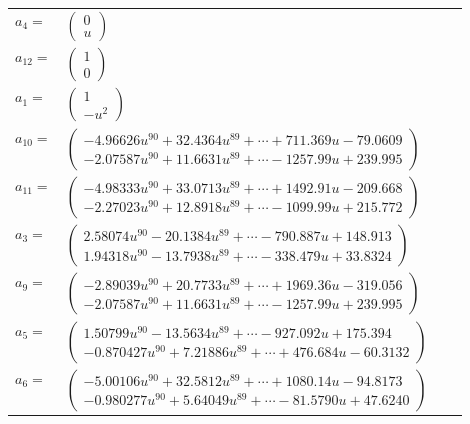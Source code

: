 \documentclass[1p]{elsarticle_modified}
\theoremstyle{definition}
\begin{document}
\begin{tabular}{m{7pt} m{180pt} m{7pt} m{180pt} }
\flushright $a_{4}=$&$\begin{pmatrix}0\\u\end{pmatrix}$ \\
\flushright $a_{12}=$&$\begin{pmatrix}1\\0\end{pmatrix}$ \\
\flushright $a_{1}=$&$\begin{pmatrix}1\\- u^2\end{pmatrix}$ \\
\flushright $a_{10}=$&$\begin{pmatrix}-4.96626 u^{90}+32.4364 u^{89}+\cdots+711.369 u-79.0609\\-2.07587 u^{90}+11.6631 u^{89}+\cdots-1257.99 u+239.995\end{pmatrix}$ \\
\flushright $a_{11}=$&$\begin{pmatrix}-4.98333 u^{90}+33.0713 u^{89}+\cdots+1492.91 u-209.668\\-2.27023 u^{90}+12.8918 u^{89}+\cdots-1099.99 u+215.772\end{pmatrix}$ \\
\flushright $a_{3}=$&$\begin{pmatrix}2.58074 u^{90}-20.1384 u^{89}+\cdots-790.887 u+148.913\\1.94318 u^{90}-13.7938 u^{89}+\cdots-338.479 u+33.8324\end{pmatrix}$ \\
\flushright $a_{9}=$&$\begin{pmatrix}-2.89039 u^{90}+20.7733 u^{89}+\cdots+1969.36 u-319.056\\-2.07587 u^{90}+11.6631 u^{89}+\cdots-1257.99 u+239.995\end{pmatrix}$ \\
\flushright $a_{5}=$&$\begin{pmatrix}1.50799 u^{90}-13.5634 u^{89}+\cdots-927.092 u+175.394\\-0.870427 u^{90}+7.21886 u^{89}+\cdots+476.684 u-60.3132\end{pmatrix}$ \\
\flushright $a_{6}=$&$\begin{pmatrix}-5.00106 u^{90}+32.5812 u^{89}+\cdots+1080.14 u-94.8173\\-0.980277 u^{90}+5.64049 u^{89}+\cdots-81.5790 u+47.6240\end{pmatrix}$ \\

\end{tabular}
\end{document}
